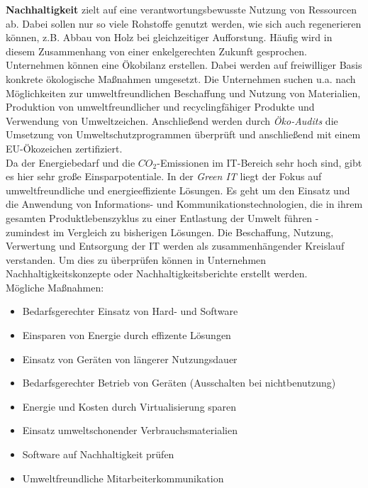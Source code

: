 \documentclass[a4paper, 12pt]{report}
\begin{document}
\textbf{Nachhaltigkeit} zielt auf eine verantwortungsbewusste Nutzung von
Ressourcen ab. Dabei sollen nur so viele Rohstoffe genutzt werden, wie sich auch
regenerieren können, z.B. Abbau von Holz bei gleichzeitiger Aufforstung. Häufig
wird in diesem Zusammenhang von einer enkelgerechten Zukunft gesprochen. \\

Unternehmen können eine Ökobilanz erstellen. Dabei werden auf freiwilliger Basis
konkrete ökologische Maßnahmen umgesetzt. Die Unternehmen suchen u.a. nach
Möglichkeiten zur umweltfreundlichen Beschaffung und Nutzung von Materialien,
Produktion von umweltfreundlicher und recyclingfähiger Produkte und Verwendung
von Umweltzeichen. Anschließend werden durch \emph{Öko-Audits} die Umsetzung von
Umweltschutzprogrammen überprüft und anschließend mit einem EU-Ökozeichen
zertifiziert. \\

Da der Energiebedarf und die $CO_2$-Emissionen im IT-Bereich sehr hoch sind,
gibt es hier sehr große Einsparpotentiale. In der \emph{Green IT} liegt der
Fokus auf umweltfreundliche und energieeffiziente Lösungen. Es geht um den
Einsatz und die Anwendung von Informations- und Kommunikationstechnologien, die
in ihrem gesamten Produktlebenszyklus zu einer Entlastung der Umwelt führen -
zumindest im Vergleich zu bisherigen Lösungen. Die Beschaffung, Nutzung,
Verwertung und Entsorgung der IT werden als zusammenhängender Kreislauf
verstanden. Um dies zu überprüfen können in Unternehmen Nachhaltigkeitskonzepte
oder Nachhaltigkeitsberichte erstellt werden. \\

\newpage
Mögliche Maßnahmen:

\begin{itemize}
    \item Bedarfsgerechter Einsatz von Hard- und Software
    \item Einsparen von Energie durch effizente Lösungen
    \item Einsatz von Geräten von längerer Nutzungsdauer
    \item Bedarfsgerechter Betrieb von Geräten (Ausschalten bei nichtbenutzung)
    \item Energie und Kosten durch Virtualisierung sparen
    \item Einsatz umweltschonender Verbrauchsmaterialien
    \item Software auf Nachhaltigkeit prüfen
    \item Umweltfreundliche Mitarbeiterkommunikation
\end{itemize}
\end{document}
